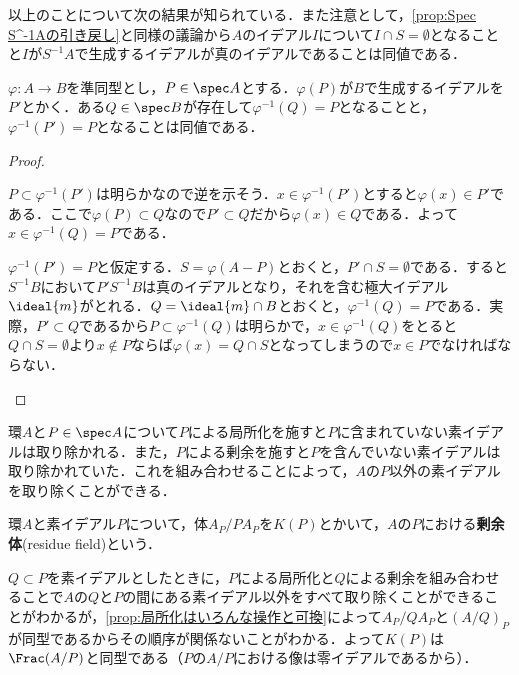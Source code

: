 以上のことについて次の結果が知られている．また注意として，\ref{prop:Spec S^-1Aの引き戻し}と同様の議論から$A$のイデアル$I$について$I\cap S=\emptyset$となることと$I$が$S^{-1}A$で生成するイデアルが真のイデアルであることは同値である．

\begin{prop}\label{prop:上にイデアルがあることの同値条件}
	$\varphi:A\to B$を準同型とし，$P\in\spec A$とする．$\varphi(P)$が$B$で生成するイデアルを$P'$とかく．ある$Q\in\spec B$が存在して$\varphi^{-1}(Q)=P$となることと，$\varphi^{-1}(P')=P$となることは同値である．
\end{prop}

\begin{proof}
	\begin{eqv}
		\item $P\subset\varphi^{-1}(P')$は明らかなので逆を示そう．$x\in\varphi^{-1}(P')$とすると$\varphi(x)\in P'$である．ここで$\varphi(P)\subset Q$なので$P'\subset Q$だから$\varphi(x)\in Q$である．よって$x\in\varphi^{-1}(Q)=P$である．
		
		\item 	$\varphi^{-1}(P')=P$と仮定する．$S=\varphi(A-P)$とおくと，$P'\cap S=\emptyset$である．すると$S^{-1}B$において$P'S^{-1}B$は真のイデアルとなり，それを含む極大イデアル$\ideal{m}$がとれる．$Q=\ideal{m}\cap B$とおくと，$\varphi^{-1}(Q)=P$である．実際，$P'\subset Q$であるから$P\subset\varphi^{-1}(Q)$は明らかで，$x\in\varphi^{-1}(Q)$をとると$Q\cap S=\emptyset$より$x\not\in P$ならば$\varphi(x)=Q\cap S$となってしまうので$x\in P$でなければならない．
	\end{eqv}
\end{proof}

環$A$と$P\in\spec A$について$P$による局所化を施すと$P$に含まれていない素イデアルは取り除かれる．また，$P$による剰余を施すと$P$を含んでいない素イデアルは取り除かれていた．これを組み合わせることによって，$A$の$P$以外の素イデアルを取り除くことができる．
\begin{defi}[剰余体]\label{defi:剰余体}
	環$A$と素イデアル$P$について，体$A_P/PA_P$を$K(P)$とかいて，$A$の$P$における\textbf{剰余体}(residue field)という．
\end{defi}

$Q\subset P$を素イデアルとしたときに，$P$による局所化と$Q$による剰余を組み合わせることで$A$の$Q$と$P$の間にある素イデアル以外をすべて取り除くことができることがわかるが，\ref{prop:局所化はいろんな操作と可換}によって$A_P/QA_P$と$(A/Q)_P$が同型であるからその順序が関係ないことがわかる．よって$K(P)$は$\Frac (A/P)$と同型である（$P$の$A/P$における像は零イデアルであるから）．

